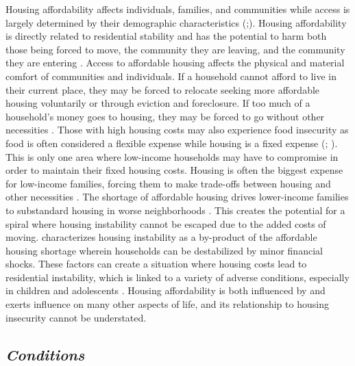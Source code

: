 Housing affordability affects individuals, families, and communities while access is largely determined by their demographic characteristics  (\citealp{braveman_housing_2011};\citealp{yadavalli_comprehensive_2020}). Housing affordability is directly related to residential stability and has the potential to harm both those being forced to move, the community they are leaving, and the community they are entering \citep{desmond_forced_2015}. Access to affordable housing affects the physical and material comfort of communities and individuals. If a household cannot afford to live in their current place, they may be forced to relocate seeking more affordable housing voluntarily or through eviction and foreclosure.  If too much of a household’s money goes to housing, they may be forced to go without other necessities \citep{herbert_measuring_2018}. Those with high housing costs may also experience food insecurity as food is often considered a flexible expense while housing is a fixed expense (\citealp{fletcher_assessing_2009}; \citealp{kropczynski_insights_2012}). This is only one area where low-income households may have to compromise in order to maintain their fixed housing costs. Housing is often the biggest expense for low-income families, forcing them to make trade-offs between housing and other necessities \citep{desmond_housing_2015}. The shortage of affordable housing drives lower-income families to substandard housing in worse neighborhoods \citep{braveman_housing_2011}. This creates the potential for a spiral where housing instability cannot be escaped due to the added costs of moving. \citet{kang_severe_2021} characterizes housing instability as a by-product of the affordable housing shortage wherein households can be destabilized by minor financial shocks. These factors can create a situation where housing costs lead to residential instability, which is linked to a variety of adverse conditions, especially in children and adolescents \citep{desmond_forced_2015}. Housing affordability is both influenced by and exerts influence on many other aspects of life, and its relationship to housing insecurity cannot be understated. %

\subsection{\textit{Conditions}}

